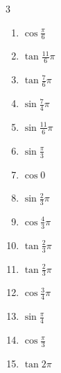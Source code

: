 \begin{multicols}{3}
\begin{enumerate}
  \item $\displaystyle \cos{\frac{\pi}{6}}$

  \item $\displaystyle \tan{\frac{11}{6}\pi}$

  \item $\displaystyle \tan{\frac{7}{6}\pi}$

  \item $\displaystyle \sin{\frac{7}{4}\pi}$

  \item $\displaystyle \sin{\frac{11}{6}\pi}$

  \item $\displaystyle \sin{\frac{\pi}{3}}$

  \item $\displaystyle \cos{0}$
        \phantom{$\displaystyle =1$}

  \item $\displaystyle \sin{\frac{2}{3}\pi}$

  \item $\displaystyle \cos{\frac{4}{3}\pi}$

  \item $\displaystyle \tan{\frac{2}{3}\pi}$

  \item $\displaystyle \tan{\frac{2}{3}\pi}$

  \item $\displaystyle \cos{\frac{3}{4}\pi}$

  \item $\displaystyle \sin{\frac{\pi}{4}}$

  \item $\displaystyle \cos{\frac{\pi}{3}}$

  \item $\displaystyle \tan{2\pi}$
        \phantom{$\displaystyle =0$}


\end{enumerate}
\end{multicols}
